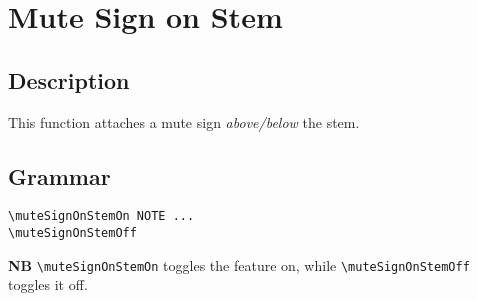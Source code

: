 \vfill \break




\section {Mute Sign on Stem}
\hfill

\subsection{Description}
This function attaches a mute sign \textit{above/below} the stem.

\subsection{Grammar}
\begin{verbatim}
\muteSignOnStemOn NOTE ...
\muteSignOnStemOff
\end{verbatim}
\textbf{NB} \verb|\muteSignOnStemOn| toggles the feature on, while \verb|\muteSignOnStemOff| toggles it off.

